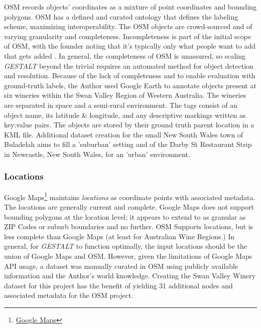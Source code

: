 OSM records objects' coordinates as a mixture of point coordinates and bounding polygons. 
OSM has a defined and curated ontology that defines the labeling scheme, maximizing interoperability. 
The OSM objects are crowd-sourced and of varying granularity and completeness. Incompleteness is part of the initial scope of OSM, with the founder noting that it's typically only what people want to add that gets added \cite{Haklay2008}.
In general, the completeness of OSM is unassured, so scaling \textit{GESTALT} beyond the trivial requires an automated method for object detection and resolution. 
Because of the lack of completeness and to enable evaluation with ground-truth labels, the Author used Google Earth to annotate objects present at six wineries within the Swan Valley Region of Western Australia. The wineries are separated in space and a semi-rural environment. The tags consist of an object name, its latitude \& longitude, and any descriptive markings written as key:value pairs. The objects are stored by their ground truth parent location in a KML file. Additional dataset creation for the small New South Wales town of Buladelah aims to fill a 'suburban' setting and of the Darby St Restaurant Strip in Newcastle, New South Wales, for an 'urban' environment. 

\subsubsection{Locations}
Google Maps\footnote{\href{https://www.google.com/maps/about/}{Google Maps}} maintains \textit{locations} as coordinate points with associated metadata. The locations are generally current and complete. 
Google Maps does not support bounding polygons at the location level; it appears to extend to as granular as ZIP Codes or suburb boundaries and no further. 
OSM Supports locations, but is less complete than Google Maps (at least for Australian Wine Regions.)
In general, for \textit{GESTALT} to function optimally, the input locations should be the union of Google Maps and OSM. However, given the limitations of Google Maps API usage, a dataset was manually curated in OSM using publicly available information and the Author's world knowledge. 
Creating the Swan Valley Winery dataset for this project has the benefit of yielding 31 additional nodes and associated metadata for the OSM project. 
